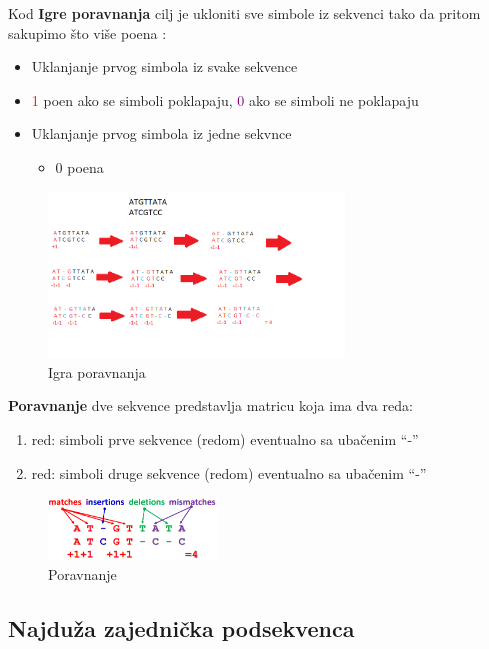 Kod \textbf{Igre poravnanja} cilj je ukloniti sve simbole iz
sekvenci tako da pritom sakupimo što više poena :
\begin{itemize}
    \item Uklanjanje prvog simbola iz svake sekvence
            \item \textcolor{red}{1} poen ako se simboli poklapaju,  \textcolor{purple}{0} ako se simboli ne poklapaju
    \item Uklanjanje prvog simbola iz jedne sekvnce
         \begin{itemize}
            \item 0 poena
        \end{itemize}
\end{itemize}

\begin{figure}[h!]
\centering
\includegraphics[width=0.7\textwidth]{poglavlja/5/slike/igraPoravnavanja.png}
\caption{Igra poravnanja}
\end{figure} 

\textbf{Poravnanje} dve sekvence predstavlja matricu koja ima dva reda:

\begin{enumerate}
    \item red: simboli prve sekvence (redom) eventualno sa ubačenim “-” 
    \item red: simboli druge sekvence (redom) eventualno sa ubačenim “-” 
\end{enumerate}
\begin{figure}[h!]
\centering
\includegraphics[width=0.4\textwidth]{poglavlja/5/slike/poravnanje.png}
\caption{Poravnanje}
\label{slika:poravnavanje}
\end{figure} 

\subsection{Najduža zajednička podsekvenca}

